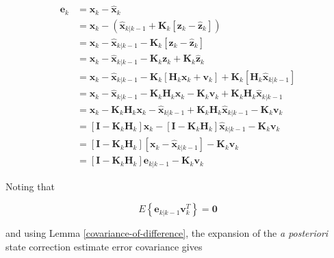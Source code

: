 \begin{equation*}
    \begin{aligned}
        \mathbf{e}_{k} &= \mathbf{x}_{k} - \hat{\mathbf{x}}_{k} \\
        &= \mathbf{x}_{k} - \left( \hat{\mathbf{x}}_{k|k-1} + \mathbf{K}_k \left[ \mathbf{z}_k - \hat{\mathbf{z}}_k \right] \right) \\
        &= \mathbf{x}_{k} - \hat{\mathbf{x}}_{k|k-1} - \mathbf{K}_k \left[ \mathbf{z}_k - \hat{\mathbf{z}}_k \right] \\
        &= \mathbf{x}_{k} - \hat{\mathbf{x}}_{k|k-1} - \mathbf{K}_k \mathbf{z}_k + \mathbf{K}_k \hat{\mathbf{z}}_k \\
        &= \mathbf{x}_{k} - \hat{\mathbf{x}}_{k|k-1} - \mathbf{K}_k \left[ \mathbf{H}_k \mathbf{x}_k + \mathbf{v}_k \right]
        + \mathbf{K}_k \left[ \mathbf{H}_k \hat{\mathbf{x}}_{k|k-1} \right] \\
        &= \mathbf{x}_{k} - \hat{\mathbf{x}}_{k|k-1} - \mathbf{K}_k \mathbf{H}_k \mathbf{x}_k - \mathbf{K}_k \mathbf{v}_k + \mathbf{K}_k \mathbf{H}_k \hat{\mathbf{x}}_{k|k-1} \\
        &= \mathbf{x}_{k} - \mathbf{K}_k \mathbf{H}_k \mathbf{x}_k - \hat{\mathbf{x}}_{k|k-1} + \mathbf{K}_k \mathbf{H}_k \hat{\mathbf{x}}_{k|k-1} - \mathbf{K}_k \mathbf{v}_k \\
        &= \left[ \mathbf{I} - \mathbf{K}_k \mathbf{H}_k \right] \mathbf{x}_{k} - \left[ \mathbf{I}
        - \mathbf{K}_k \mathbf{H}_k \right] \hat{\mathbf{x}}_{k|k-1} - \mathbf{K}_k \mathbf{v}_k \\
        &= \left[ \mathbf{I} - \mathbf{K}_k \mathbf{H}_k \right] \left[ \mathbf{x}_{k} - \hat{\mathbf{x}}_{k|k-1} \right] - \mathbf{K}_k \mathbf{v}_k \\
        &= \left[ \mathbf{I} - \mathbf{K}_k \mathbf{H}_k \right] \mathbf{e}_{k|k-1} - \mathbf{K}_k \mathbf{v}_k
    \end{aligned}
\end{equation*}

Noting that

\begin{equation*}
    E \left\{ \mathbf{e}_{k|k-1} \mathbf{v}_k^T \right\} = \mathbf{0}
\end{equation*}

and using Lemma \ref{covariance-of-difference}, the expansion of the \textit{a posteriori}
state correction estimate error covariance gives

